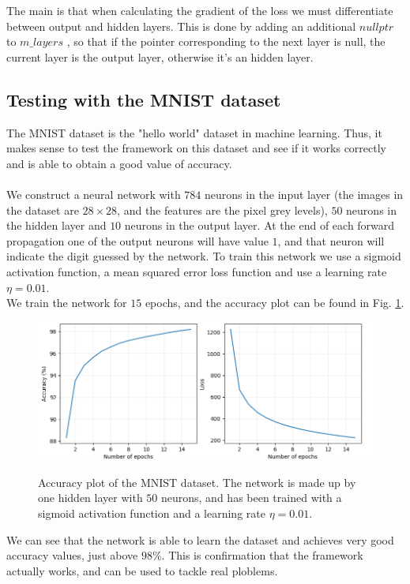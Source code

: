 \documentclass[12pt]{article}
\begin{document}

\noindent The main is that when calculating the gradient of the loss we must differentiate between output 
and hidden 
layers. This is done by adding an additional $nullptr$ to $m\_layers$ , so that if the pointer corresponding
to the next layer is null, the current layer is the output layer, otherwise it's an hidden layer.
\subsection{Testing with the MNIST dataset}
The MNIST dataset is the "hello world" dataset in machine learning. Thus, it makes sense to test the 
framework on this dataset and see if it works correctly and is able to obtain a good value of accuracy. \\ \\
We construct a neural network with $784$ neurons in the input layer (the images in the dataset are 
$28 \times 28$, and the features are the pixel grey levels), $50$ neurons in the hidden layer and $10$
neurons in the output layer. At the end of each forward propagation one of the output neurons will have value
$1$, and that neuron will indicate the digit guessed by the network. To train this network we use a sigmoid
activation function, a mean squared error loss function and use a learning rate $\eta = 0.01$. \\
We train the network for $15$ epochs, and the accuracy plot can be found in Fig. \ref{mnist}.
\begin{figure}[h]
  \centering
  \includegraphics[scale=0.5]{./img/mnist.png}	
  \label{mnist}
  \caption{Accuracy plot of the MNIST dataset. The network is made up by one hidden layer with $50$ neurons, 
  and has been trained with a sigmoid activation function and a learning rate $\eta = 0.01$.}
\end{figure}
We can see that the network is able to learn the dataset and achieves very good accuracy values, just above
$98 \%$. This is confirmation that the framework actually works, and can be used to tackle real ploblems.
\newpage
\pagebreak
\end{document}
